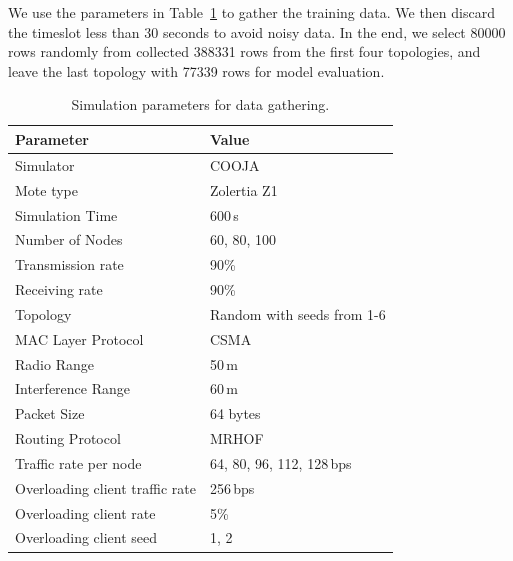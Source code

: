 We use the parameters in
Table~\ref{tab:data-gathering-sim-parameters} to gather the training
data. We then discard the timeslot less than 30 seconds to avoid
noisy data. In the end, we select 80000 rows randomly from collected
388331 rows from the first four topologies, and leave the last
topology with 77339 rows for model evaluation.

\begin{table}[ht]
    \caption{Simulation parameters for data gathering.}
    \label{tab:data-gathering-sim-parameters}
    \begin{center}
        \begin{tabular}{ll}
            \hline
            \textbf{Parameter} & \textbf{Value} \\
            \hline
            Simulator                      & COOJA \\
            Mote type                      & Zolertia Z1 \\
            Simulation Time                & 600\,s \\
            Number of Nodes                & 60, 80, 100 \\
            Transmission rate              & 90\% \\
            Receiving rate                 & 90\% \\
            Topology                       & Random with seeds from 1-6 \\
            MAC Layer Protocol             & CSMA \\
            Radio Range                    & 50\,m \\
            Interference Range             & 60\,m \\
            Packet Size                    & 64 bytes \\
            Routing Protocol               & MRHOF \\
            Traffic rate per node          & 64, 80, 96, 112, 128\,bps \\
            Overloading client traffic rate & 256\,bps \\
            Overloading client rate        & 5\% \\
            Overloading client seed        & 1, 2 \\
            \hline
        \end{tabular}
    \end{center}
\end{table}
